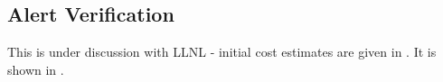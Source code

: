 \subsection{Alert Verification} \label{sec:5perform}

This is under discussion with \gls{LLNL} - initial cost estimates are given in .
It is shown in .

